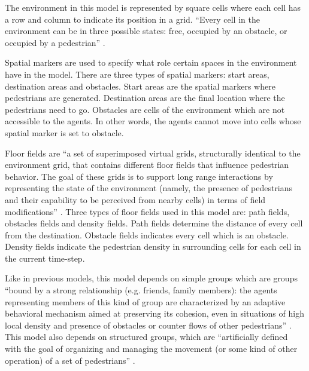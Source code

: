 \documentclass[tog]{acmsiggraph}
\begin{document}
The environment in this model is represented by square cells where each cell has a row and column to indicate its position in a grid.  ``Every cell in the environment can be in three possible states: free, occupied by an obstacle, or occupied by a pedestrian'' \cite{vizzari2013adaptiveped}.

Spatial markers are used to specify what role certain spaces in the environment have in the model.  There are three types of spatial markers: start areas, destination areas and obstacles.  Start areas are the spatial markers where pedestrians are generated.  Destination areas are the final location where the pedestrians need to go.  Obstacles are cells of the environment which are not accessible to the agents.  In other words, the agents cannot move into cells whose spatial marker is set to obstacle.

Floor fields are ``a set of superimposed virtual grids, structurally identical to the environment grid, that contains different floor fields that influence pedestrian behavior. The goal of these grids is to support long range interactions by representing the state of the environment (namely, the presence of pedestrians and their capability to be perceived from nearby cells) in terms of field modifications'' \cite{vizzari2013adaptiveped}.  Three types of floor fields used in this model are: path fields, obstacles fields and density fields.  Path fields determine the distance of every cell from the destination.  Obstacle fields indicates every cell which is an obstacle.  Density fields indicate the pedestrian density in surrounding cells for each cell in the current time-step.

Like in previous models, this model depends on simple groups which are groups ``bound by a strong relationship (e.g. friends, family members): the agents representing members of this kind of group are characterized by an adaptive behavioral mechanism aimed at preserving its cohesion, even in situations of high local density and presence of obstacles or counter flows of other pedestrians'' \cite{vizzari2013adaptiveped}.  This model also depends on structured groups, which are ``artificially defined with the goal of organizing and managing the movement (or some kind of other operation) of a set of pedestrians'' \cite{vizzari2013adaptiveped}.  
\end{document}
